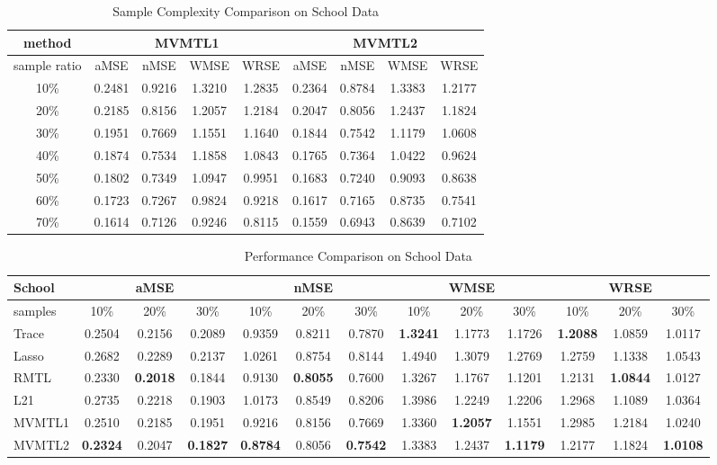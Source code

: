 \documentclass[twoside,leqno,twocolumn]{article}
\begin{document}
%
\begin{table}[h]
\begin{tabular}{|c|c|c|c|c|c|c|c|c|}
\hline 
method & \multicolumn{4}{c|}{MVMTL1} & \multicolumn{4}{c|}{MVMTL2}\tabularnewline
\hline 
\hline 
sample ratio& aMSE & nMSE & WMSE & WRSE & aMSE & nMSE & WMSE & WRSE\tabularnewline
\hline 
10\% & 0.2481 & 0.9216 & 1.3210 & 1.2835 & 0.2364  & 0.8784 & 1.3383 & 1.2177\tabularnewline
\hline 
20\% & 0.2185 & 0.8156 & 1.2057 & 1.2184 & 0.2047 & 0.8056 & 1.2437 & 1.1824\tabularnewline
\hline 
30\% & 0.1951 & 0.7669 & 1.1551 & 1.1640 & 0.1844  & 0.7542 & 1.1179 & 1.0608\tabularnewline
\hline 
40\% & 0.1874 & 0.7534 & 1.1858 & 1.0843 & 0.1765 & 0.7364 & 1.0422 & 0.9624\tabularnewline
\hline 
50\% & 0.1802 & 0.7349 & 1.0947 & 0.9951 & 0.1683 & 0.7240 & 0.9093 & 0.8638\tabularnewline
\hline 
60\% & 0.1723 & 0.7267 & 0.9824 & 0.9218 & 0.1617 & 0.7165 & 0.8735 & 0.7541\tabularnewline
\hline 
70\% & 0.1614 & 0.7126 & 0.9246 & 0.8115 & 0.1559 & 0.6943 & 0.8639 & 0.7102\tabularnewline
\hline 
\end{tabular}
\caption{Sample Complexity Comparison on School Data}
\label{tab: sample_school}
\end{table}
%
\begin{table}[h]
\begin{tabular}{|p{1cm}|c|c|c|c|c|c|c|c|c|c|c|c|}
\hline 
\small School& \multicolumn{3}{c|}{aMSE} & \multicolumn{3}{c|}{nMSE} & \multicolumn{3}{c|}{WMSE} & \multicolumn{3}{c|}{WRSE}\tabularnewline
\hline 
\tiny samples & 10\% & 20\% & 30\% & 10\% & 20\% & 30\% & 10\% & 20\% & 30\% & 10\% & 20\% & 30\%\tabularnewline
\hline 
\tiny Trace & 0.2504 & 0.2156 & 0.2089 & 0.9359 & 0.8211 & 0.7870 & \textbf{1.3241} & 1.1773 & 1.1726 & \small \textbf{1.2088} & 1.0859 & 1.0117\tabularnewline
\hline 
\tiny Lasso & 0.2682 & 0.2289 & 0.2137 & 1.0261 & 0.8754 & 0.8144 & 1.4940 & 1.3079 & 1.2769 & 1.2759 & 1.1338 & 1.0543\tabularnewline
\hline 
\tiny RMTL & 0.2330 & \small\textbf{0.2018} & 0.1844 & 0.9130 &\small\textbf{ 0.8055} & 0.7600 & 1.3267 & 1.1767 & 1.1201 & 1.2131 & \small\textbf{1.0844} & 1.0127\tabularnewline
\hline 
\tiny L21 & 0.2735  & 0.2218 & 0.1903  & 1.0173 & 0.8549 & 0.8206 & 1.3986 & 1.2249 & 1.2206 & 1.2968 & 1.1089 & 1.0364\tabularnewline
\hline 
\tiny MVMTL1 & 0.2510  & 0.2185 & 0.1951  & 0.9216 & 0.8156 & 0.7669 & 1.3360 & \textbf{1.2057} & 1.1551 & 1.2985 & 1.2184 & 1.0240\tabularnewline
\hline 
\tiny MVMTL2 & \small\textbf{0.2324}  & 0.2047 & \small\textbf{0.1827}  & \small\textbf{0.8784} & 0.8056 & \small\textbf{0.7542} & 1.3383 & 1.2437 & \small\textbf{1.1179} & 1.2177 & 1.1824 & \small\textbf{1.0108}\tabularnewline
\hline 
\end{tabular}
\caption{Performance Comparison on School Data}
\label{tab:per_school}
\end{table}
\end{document}
